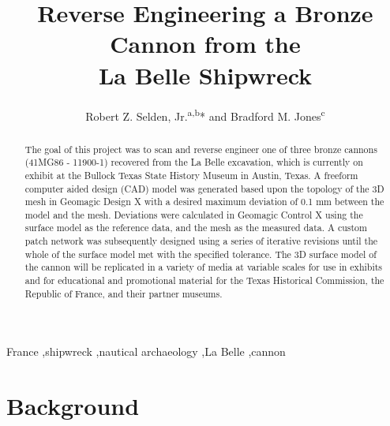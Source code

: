\documentclass[review]{elsarticle}
\begin{document}
\begin{frontmatter}

\title{Reverse Engineering a Bronze Cannon from the\\La Belle Shipwreck}

\author{Robert Z. Selden, Jr.\textsuperscript{a,b}* and Bradford M. Jones\textsuperscript{c}}
\address[1]{Heritage Research Center, Stephen F. Austin State University, USA}
\address[2]{Cultural Heritage Department, Jean Monnet University, FR}
\address[3]{Archeology Division, Texas Historical Commission, Austin, USA}

\begin{abstract}
The goal of this project was to scan and reverse engineer one of three bronze cannons (41MG86 - 11900-1) recovered from the La Belle excavation, which is currently on exhibit at the Bullock Texas State History Museum in Austin, Texas. A freeform computer aided design (CAD) model was generated based upon the topology of the 3D mesh in Geomagic Design X with a desired maximum deviation of 0.1 mm between the model and the mesh. Deviations were calculated in Geomagic Control X using the surface model as the reference data, and the mesh as the measured data. A custom patch network was subsequently designed using a series of iterative revisions until the whole of the surface model met with the specified tolerance. The 3D surface model of the cannon will be replicated in a variety of media at variable scales for use in exhibits and for educational and promotional material for the Texas Historical Commission, the Republic of France, and their partner museums.
\end{abstract}

\begin{keyword}
France \sep shipwreck \sep nautical archaeology \sep La Belle \sep cannon


\end{keyword}

\end{frontmatter}

\linenumbers

\section*{Background}
\end{document}
